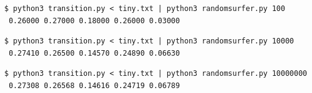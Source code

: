 \documentclass[8pt,a4paper,compress]{beamer}
\begin{document}
\begin{frame}[fragile]
\pause

\begin{lstlisting}[language={},style=focusin]
$ python3 transition.py < tiny.txt | python3 randomsurfer.py 100
 0.26000 0.27000 0.18000 0.26000 0.03000
\end{lstlisting}

\pause\bigskip

\begin{lstlisting}[language={},style=focusin]
$ python3 transition.py < tiny.txt | python3 randomsurfer.py 10000
 0.27410 0.26500 0.14570 0.24890 0.06630
\end{lstlisting}

\pause\bigskip

\begin{lstlisting}[language={},style=focusin]
$ python3 transition.py < tiny.txt | python3 randomsurfer.py 10000000
 0.27308 0.26568 0.14616 0.24719 0.06789
\end{lstlisting}
\end{frame}
\end{document}
